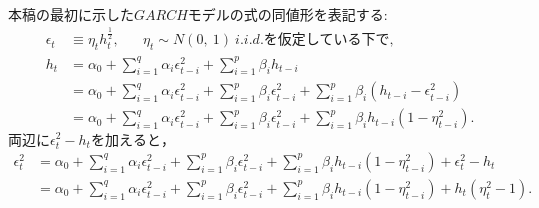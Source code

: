 \documentclass[8pt]{jsarticle}
\begin{document}
\begin{breakbox}
	{}\\
	本稿の最初に示した$GARCH$モデルの式の同値形を表記する:
	\begin{align*}
		\epsilon_t &\equiv \eta_t h_t^{\frac{1}{2}}, \hspace{20pt} \eta_t \sim N(0,\ 1)\ i.i.d. \mbox{を仮定している下で,}\\
		h_t &= \alpha_0 + \sum_{i=1}^{q} \alpha_i \epsilon_{t-i}^2 + \sum_{i=1}^{p} \beta_i h_{t-i} \\
		&= \alpha_0 + \sum_{i=1}^{q} \alpha_i \epsilon_{t-i}^2 + \sum_{i=1}^{p} \beta_i \epsilon_{t-i}^2 + \sum_{i=1}^{p} \beta_i (h_{t-i} - \epsilon_{t-i}^2) \\
		&= \alpha_0 + \sum_{i=1}^{q} \alpha_i \epsilon_{t-i}^2 + \sum_{i=1}^{p} \beta_i \epsilon_{t-i}^2 + \sum_{i=1}^{p} \beta_i h_{t-i}(1 - \eta_{t-i}^2).
	\end{align*}
	$両辺に \epsilon_t^2 - h_t を加えると，$
	\begin{align*}
		\epsilon_t^2 &= \alpha_0 + \sum_{i=1}^{q} \alpha_i \epsilon_{t-i}^2 + \sum_{i=1}^{p} \beta_i \epsilon_{t-i}^2 
			+ \sum_{i=1}^{p} \beta_i h_{t-i}(1 - \eta_{t-i}^2) + \epsilon_t^2 - h_t \\
		&= \alpha_0 + \sum_{i=1}^{q} \alpha_i \epsilon_{t-i}^2 + \sum_{i=1}^{p} \beta_i \epsilon_{t-i}^2 
			+ \sum_{i=1}^{p} \beta_i h_{t-i}(1 - \eta_{t-i}^2) + h_t(\eta_t^2 - 1).
	\end{align*}
\end{breakbox}
\end{document}
